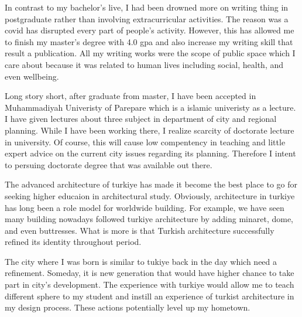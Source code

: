 \documentclass[12pt]{simart} %
\begin{document}
In contrast to my bachelor's live, I had been drowned more on writing thing in postgraduate rather than involving extracurricular activities. The reason was a covid has disrupted every part of people's activity. However, this has allowed me to finish my master's degree with 4.0 gpa and also increase my writing skill that result a publication. All my writing works were the scope of public space which I care about because it was related to human lives including social, health, and even wellbeing.

Long story short, after graduate from master, I have been accepted in Muhammadiyah Univeristy of Parepare which is a islamic univeristy as a lecture. I have given lectures about three subject in department of city and regional planning. While I have been working there, I realize scarcity of doctorate lecture in university. Of course, this will cause low compentency in teaching and little expert advice on the current city issues regarding its planning. Therefore I intent to persuing doctorate degree that was available out there.

The advanced architecture of turkiye has made it become the best place to go for seeking higher educaion in architectural study. Obviously, architecture in turkiye has long been a role model for worldwide building. For example, we have seen many building nowadays followed turkiye architecture by adding minaret, dome, and even buttresses. What is more is that Turkish architecture successfully refined its identity throughout period.

The city where I was born is similar to tukiye back in the day which need a refinement. Someday, it is new generation that would have higher chance to take part in city's development. The experience with turkiye would allow me to teach different sphere to my student and instill an experience of turkist architecture in my design process. These actions potentially level up my hometown.



\end{document}
